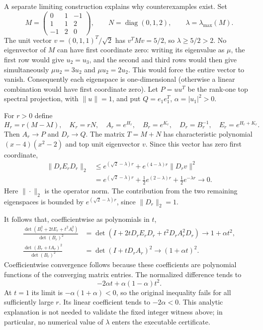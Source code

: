 \begin{cxrefutation}
\begin{remark}
A separate limiting construction explains why counterexamples exist.
Set
\[
 M=\begin{pmatrix}0&1&-1\\1&1&2\\-1&2&0\end{pmatrix},
 \qquad N=\operatorname{diag}(0,1,2),
 \qquad \lambda=\lambda_{\max}(M).
\]
The unit vector $v=(0,1,1)^T/\sqrt2$ has $v^TMv=5/2$, so
$\lambda\geq5/2>2$. No eigenvector of $M$ can have first coordinate zero: writing its eigenvalue
as $\mu$, the first row would give $u_2=u_3$, and the second and third rows
would then give simultaneously $\mu u_2=3u_2$ and $\mu u_2=2u_2$.
This would force the entire vector to vanish. Consequently each eigenspace
is one-dimensional (otherwise a linear combination would have first
coordinate zero). Let $P=uu^T$ be the rank-one top spectral projection,
with $\|u\|=1$, and put $Q=e_1e_1^T$, $\alpha=|u_1|^2>0$.

For $r>0$ define
\[
 H_r=r(M-\lambda I),\quad K_r=rN,\quad
 A_r=e^{H_r},\quad B_r=e^{K_r},\quad
 D_r=B_r^{-1},\quad E_r=e^{H_r+K_r}.
\]
Then $A_r\longrightarrow P$ and $D_r\longrightarrow Q$. The matrix
$T=M+N$ has characteristic polynomial $(x-4)(x^2-2)$ and top unit
eigenvector $v$. Since this vector has zero first coordinate,
\begin{align*}
 \|D_rE_rD_r\|_2
 &\leq e^{(\sqrt2-\lambda)r}
       +e^{(4-\lambda)r}\|D_rv\|^2\\
 &=e^{(\sqrt2-\lambda)r}
   +\tfrac12 e^{(2-\lambda)r}
   +\tfrac12 e^{-\lambda r}
 \longrightarrow0.
\end{align*}
Here $\|\cdot\|_2$ is the operator norm. The contribution from the two
remaining eigenspaces is bounded by $e^{(\sqrt2-\lambda)r}$, since
$\|D_r\|_2=1$.

It follows that, coefficientwise as polynomials in $t$,
\begin{align*}
 \frac{\det(B_r^2+2tE_r+t^2A_r^2)}{\det(B_r)^2}
 &=\det(I+2tD_rE_rD_r+t^2D_rA_r^2D_r)
 \longrightarrow1+\alpha t^2,\\
 \frac{\det(B_r+tA_r)^2}{\det(B_r)^2}
 &=\det(I+tD_rA_r)^2
 \longrightarrow(1+\alpha t)^2.
\end{align*}
Coefficientwise convergence follows because these coefficients are polynomial
functions of the converging matrix entries. The normalized difference tends to
\[
 -2\alpha t+\alpha(1-\alpha)t^2.
\]
At $t=1$ its limit is $-\alpha(1+\alpha)<0$, so the original inequality
fails for all sufficiently large $r$. Its linear coefficient tends to
$-2\alpha<0$. This analytic explanation is not needed to validate the fixed
integer witness above; in particular, no numerical value of $\lambda$ enters
the executable certificate.
\end{remark}


\end{cxrefutation}
